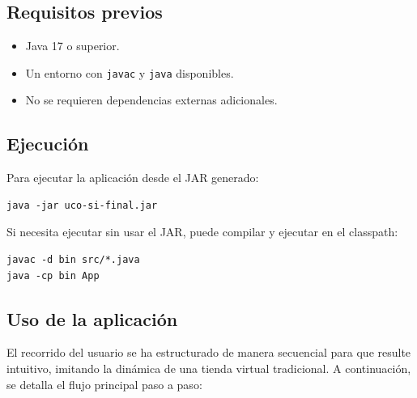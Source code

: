 \documentclass[12pt,a4paper]{article}
\begin{document}
\subsection{Requisitos previos}

\begin{itemize}
	\item Java 17 o superior.
	\item Un entorno con \texttt{javac} y \texttt{java} disponibles.
	\item No se requieren dependencias externas adicionales.
\end{itemize}

\subsection{Ejecución}

Para ejecutar la aplicación desde el JAR generado:

\begin{verbatim}
java -jar uco-si-final.jar
\end{verbatim}

Si necesita ejecutar sin usar el JAR, puede compilar y ejecutar en el classpath:
\begin{verbatim}
javac -d bin src/*.java
java -cp bin App
\end{verbatim}

\subsection{Uso de la aplicación}

El recorrido del usuario se ha estructurado de manera secuencial para que resulte intuitivo, imitando la dinámica de una tienda virtual tradicional. A continuación, se detalla el flujo principal paso a paso:
\end{document}
